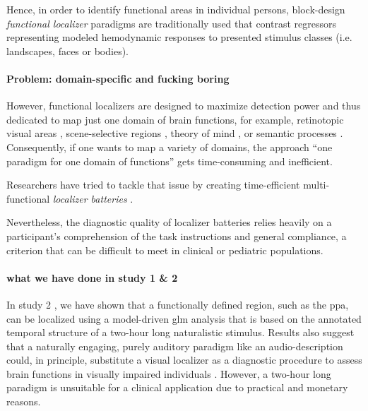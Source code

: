 Hence, in order to identify functional areas in individual persons, block-design
\textit{functional localizer} paradigms are traditionally used that contrast
regressors representing modeled hemodynamic responses to presented stimulus
classes (i.e. landscapes, faces or bodies).



\paragraph{Problem: domain-specific and fucking boring}

However, functional localizers are designed to maximize detection power and thus
dedicated to map just one domain of brain functions, for example, retinotopic
visual areas \citep{wang2015probabilistic}, scene-selective regions
\citep{stigliani2015temporal}, theory of mind \citep{spunt2014validating}, or
semantic processes \citep{fernandez2001language}.
Consequently, if one wants to map a variety of domains, the approach ``one
paradigm for one domain of functions'' gets time-consuming and inefficient.


Researchers have tried to tackle that issue by creating time-efficient
multi-functional \textit{localizer batteries} \citep[e.g.,][]{barch2013function,
drobyshevsky2006rapid, pinel2007fast}.

Nevertheless, the diagnostic quality of localizer batteries relies heavily on
a participant's comprehension of the task instructions and general compliance,
a criterion that can be difficult to meet in clinical or pediatric populations.



\paragraph{what we have done in study 1 \& 2}

%
In study 2 \citep{haeusler2022processing}, we have shown that a functionally
defined region, such as the \ac{ppa}, can be localized using a model-driven
\ac{glm} analysis that is based on the annotated temporal structure of a
two-hour long naturalistic stimulus.
%
Results also suggest that a naturally engaging, purely auditory paradigm like an
audio-description could, in principle, substitute a visual localizer as a
diagnostic procedure to assess brain functions in visually impaired individuals
\citep{haeusler2022processing}.
%
However, a two-hour long paradigm is unsuitable for a clinical application due
to practical and monetary reasons.


